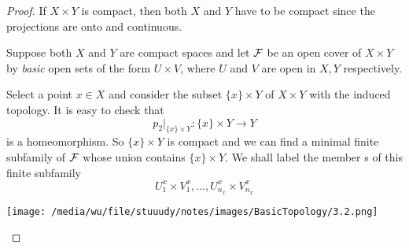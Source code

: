 \documentclass[11pt]{article}
\begin{document}
\begin{proof}
If \(X\times Y\) is compact, then both \(X\) and \(Y\) have to be compact
since the projections are onto and continuous.

Suppose both \(X\) and \(Y\) are compact spaces and let \(\mathcal{F}\) be an open
cover of \(X\times Y\) by \emph{basic} open sets of the form \(U\times V\), where
\(U\) and \(V\) are open in \(X,Y\) respectively.

Select a point \(x\in X\) and consider the subset \(\{x\}\times Y\) of
\(X\times Y\) with the induced topology. It is easy to check that
\begin{equation*}
p_2|_{\{x\}\times Y}:\{x\}\times Y\to Y
\end{equation*}
is a homeomorphism.  So \(\{x\}\times Y\) is compact and we can find a
minimal finite subfamily of \(\mathcal{F}\) whose union contains \(\{x\}\times Y\).
We shall label the member s of this finite subfamily
\begin{equation*}
U_1^x\times V_1^x,\dots,U_{n_x}^x\times V_{n_x}^x
\end{equation*}

\begin{center}
\texttt{[image: /media/wu/file/stuuudy/notes/images/BasicTopology/3.2.png]}
\end{center}
\end{proof}
\end{document}
